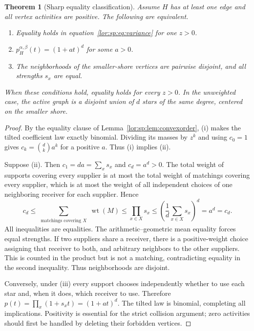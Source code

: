 \documentclass[11pt]{article}
\numberwithin{equation}{section}
\newtheorem{theorem}{Theorem}[section]
\theoremstyle{definition}
\newcommand{\wt}{\operatorname{wt}}
\begin{document}
\begin{theorem}[Sharp equality classification]
\label{lor:sp:thm:equality}
Assume $H$ has at least one edge and all vertex activities are positive. The
following are equivalent.
\begin{enumerate}[label=(\roman*),leftmargin=2em]
\item Equality holds in equation~\eqref{lor:sp:eq:variance} for one $z>0$.
\item $p_H^{\alpha,\beta}(t)=(1+at)^d$ for some $a>0$.
\item The neighborhoods of the smaller-shore vertices are pairwise disjoint,
and all strengths $s_x$ are equal.
\end{enumerate}
When these conditions hold, equality holds for every $z>0$. In the unweighted
case, the active graph is a disjoint union of $d$ stars of the same degree,
centered on the smaller shore.
\end{theorem}
\begin{proof}
By the equality clause of Lemma~\ref{lor:sp:lem:convexorder}, (i) makes the tilted
coefficient law exactly binomial. Dividing its masses by $z^k$ and using
$c_0=1$ gives $c_k=\binom d k a^k$ for a positive $a$. Thus (i) implies (ii).

Suppose (ii). Then $c_1=da=\sum_xs_x$ and $c_d=a^d>0$. The total weight of
supports covering every supplier is at most the total weight of matchings
covering every supplier, which is at most the weight of all independent
choices of one neighboring receiver for each supplier. Hence
\begin{equation}
 c_d\le\sum_{\substack{\text{matchings covering }X}}\wt(M)
 \le\prod_{x\in X}s_x
 \le\left(\frac1d\sum_{x\in X}s_x\right)^d=a^d=c_d.
 \label{lor:sp:eq:equalitychain}
\end{equation}
All inequalities are equalities. The arithmetic--geometric mean equality
forces equal strengths. If two suppliers share a receiver, there is a
positive-weight choice assigning that receiver to both, and arbitrary neighbors
to the other suppliers. This is counted in the product but is not a matching,
contradicting equality in the second inequality. Thus neighborhoods are disjoint.

Conversely, under (iii) every support chooses independently whether to use each
star and, when it does, which receiver to use. Therefore
$p(t)=\prod_x(1+s_xt)=(1+at)^d$. The tilted law is binomial, completing all
implications. Positivity is essential for the strict collision argument;
zero activities should first be handled by deleting their forbidden vertices.
\end{proof}
\end{document}
